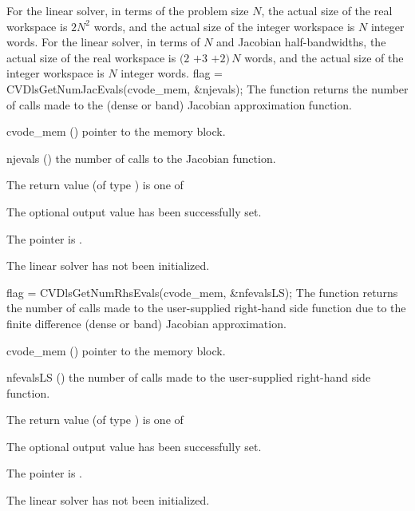 {
  For the {\cvdense} linear solver, in terms of the problem size $N$, 
  the actual size of the real workspace is $2N^2$  words, 
  and the actual size of the integer workspace is $N$ integer words.
  For the {\cvband} linear solver, in terms of $N$ 
  and Jacobian half-bandwidths, the actual size of the real workspace is
  $(2$ $+ 3$ $+ 2)\, N$  words,
  and the actual size of the integer workspace is $N$ integer words.
}
{
  flag = CVDlsGetNumJacEvals(cvode\_mem, \&njevals);
}
{
  The function  returns the
  number of calls made to the {\cvdls} (dense or band) 
  Jacobian approximation function.
}
{
  \begin{args}
  \item[cvode\_mem] ()
    pointer to the {\cvodes} memory block.
  \item[njevals] ()
    the number of calls to the Jacobian function.
  \end{args}
}
{
  The return value  (of type ) is one of
  \begin{args}
  \item[\Id{CVDLS\_SUCCESS}] 
    The optional output value has been successfully set.
  \item[\Id{CVDLS\_MEM\_NULL}]
    The  pointer is .
  \item[\Id{CVDLS\_LMEM\_NULL}]
    The {\cvdls} linear solver has not been initialized.
  \end{args}
}
{}
{
  flag = CVDlsGetNumRhsEvals(cvode\_mem, \&nfevalsLS);
}
{
  The function  returns the
  number of calls made to the user-supplied right-hand side function due to the 
  finite difference (dense or band) Jacobian approximation.
}
{
  \begin{args}
  \item[cvode\_mem] ()
    pointer to the {\cvodes} memory block.
  \item[nfevalsLS] ()
    the number of calls made to the user-supplied right-hand side function.
  \end{args}
}
{
  The return value  (of type ) is one of
  \begin{args}
  \item[\Id{CVDLS\_SUCCESS}] 
    The optional output value has been successfully set.
  \item[\Id{CVDLS\_MEM\_NULL}]
    The  pointer is .
  \item[\Id{CVDLS\_LMEM\_NULL}]
    The {\cvdls} linear solver has not been initialized.
  \end{args}
}
